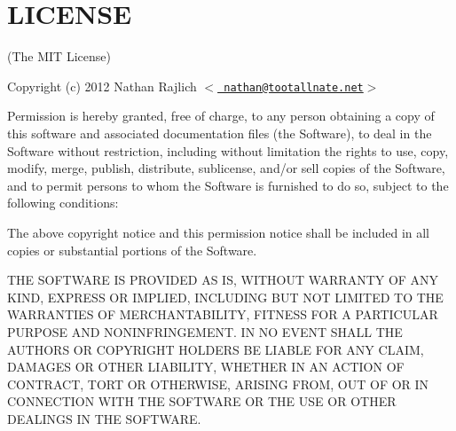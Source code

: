\chapter{LICENSE}
\hypertarget{md_backend_2node__modules_2bindings_2_l_i_c_e_n_s_e}{}\label{md_backend_2node__modules_2bindings_2_l_i_c_e_n_s_e}
(The MIT License)

Copyright (c) 2012 Nathan Rajlich \texorpdfstring{$<$}{<}\href{mailto:nathan@tootallnate.net}{\texttt{ nathan@tootallnate.\+net}}\texorpdfstring{$>$}{>}

Permission is hereby granted, free of charge, to any person obtaining a copy of this software and associated documentation files (the \textquotesingle{}Software\textquotesingle{}), to deal in the Software without restriction, including without limitation the rights to use, copy, modify, merge, publish, distribute, sublicense, and/or sell copies of the Software, and to permit persons to whom the Software is furnished to do so, subject to the following conditions\+:

The above copyright notice and this permission notice shall be included in all copies or substantial portions of the Software.

THE SOFTWARE IS PROVIDED \textquotesingle{}AS IS\textquotesingle{}, WITHOUT WARRANTY OF ANY KIND, EXPRESS OR IMPLIED, INCLUDING BUT NOT LIMITED TO THE WARRANTIES OF MERCHANTABILITY, FITNESS FOR A PARTICULAR PURPOSE AND NONINFRINGEMENT. IN NO EVENT SHALL THE AUTHORS OR COPYRIGHT HOLDERS BE LIABLE FOR ANY CLAIM, DAMAGES OR OTHER LIABILITY, WHETHER IN AN ACTION OF CONTRACT, TORT OR OTHERWISE, ARISING FROM, OUT OF OR IN CONNECTION WITH THE SOFTWARE OR THE USE OR OTHER DEALINGS IN THE SOFTWARE. 